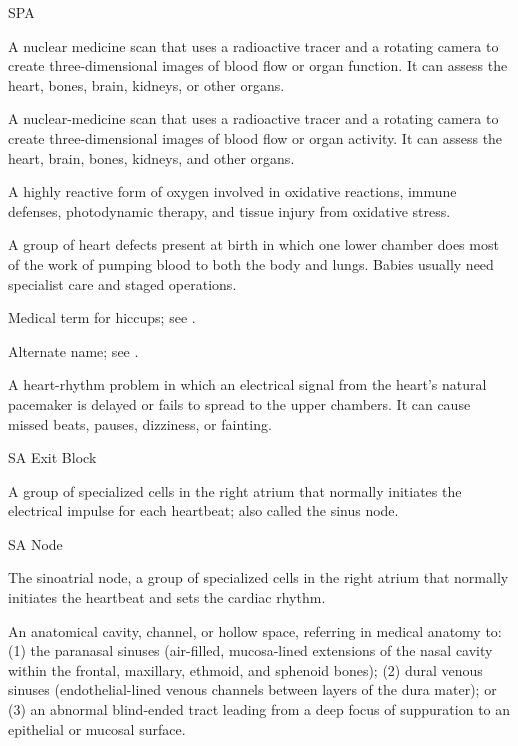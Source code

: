 \synonyms
SPA

 A nuclear medicine scan that uses a radioactive tracer and a rotating camera to create three-dimensional images of blood flow or organ function. It can assess the heart, bones, brain, kidneys, or other organs.

 A nuclear-medicine scan that uses a radioactive tracer and a rotating camera to create three-dimensional images of blood flow or organ activity. It can assess the heart, brain, bones, kidneys, and other organs.

 A highly reactive form of oxygen involved in oxidative reactions, immune defenses, photodynamic therapy, and tissue injury from oxidative stress.

 A group of heart defects present at birth in which one lower chamber does most of the work of pumping blood to both the body and lungs. Babies usually need specialist care and staged operations.

 Medical term for hiccups; see .

 Alternate name; see .

 A heart-rhythm problem in which an electrical signal from the heart’s natural pacemaker is delayed or fails to spread to the upper chambers. It can cause missed beats, pauses, dizziness, or fainting.

\synonyms
SA Exit Block

 A group of specialized cells in the right atrium that normally initiates the electrical impulse for each heartbeat; also called the sinus node.

\synonyms
SA Node

 The sinoatrial node, a group of specialized cells in the right atrium that normally initiates the heartbeat and sets the cardiac rhythm.

 An anatomical cavity, channel, or hollow space, referring in medical anatomy to: (1) the paranasal sinuses (air-filled, mucosa-lined extensions of the nasal cavity within the frontal, maxillary, ethmoid, and sphenoid bones); (2) dural venous sinuses (endothelial-lined venous channels between layers of the dura mater); or (3) an abnormal blind-ended tract leading from a deep focus of suppuration to an epithelial or mucosal surface.

